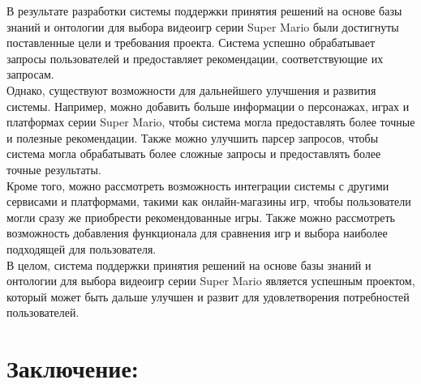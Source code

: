\documentclass[12pt,onecolumn]{article}
\begin{document}
В результате разработки системы поддержки принятия решений на основе базы знаний и онтологии для выбора видеоигр серии Super Mario были достигнуты поставленные цели и требования проекта. Система успешно обрабатывает запросы пользователей и предоставляет рекомендации, соответствующие их запросам.\\

Однако, существуют возможности для дальнейшего улучшения и развития системы. Например, можно добавить больше информации о персонажах, играх и платформах серии Super Mario, чтобы система могла предоставлять более точные и полезные рекомендации. Также можно улучшить парсер запросов, чтобы система могла обрабатывать более сложные запросы и предоставлять более точные результаты.\\

Кроме того, можно рассмотреть возможность интеграции системы с другими сервисами и платформами, такими как онлайн-магазины игр, чтобы пользователи могли сразу же приобрести рекомендованные игры. Также можно рассмотреть возможность добавления функционала для сравнения игр и выбора наиболее подходящей для пользователя.\\

В целом, система поддержки принятия решений на основе базы знаний и онтологии для выбора видеоигр серии Super Mario является успешным проектом, который может быть дальше улучшен и развит для удовлетворения потребностей пользователей.\\

\section{Заключение:}
\end{document}
